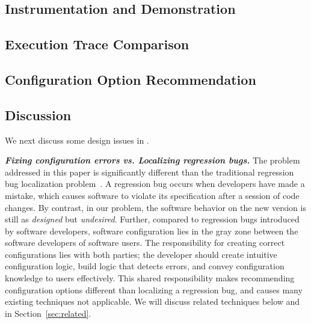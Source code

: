 \subsection{Instrumentation and Demonstration}
\label{sec:profiling}



\subsection{Execution Trace Comparison}
\label{sec:comparison}



\subsection{Configuration Option Recommendation}
\label{sec:rootcause}



\subsection{Discussion}
\label{sec:tech_discuss}

We next discuss some design issues in \ourtool.

\vspace{1mm}

\noindent \textbf{\textit{Fixing configuration errors 
vs. Localizing regression bugs.}}
The problem addressed in this paper is significantly different
than the traditional regression bug localization problem~\cite{dd, autoflow}.
A regression bug occurs when developers have made a mistake,
which causes software to violate its specification after a session of code changes.
By contrast, in our problem, the software behavior on the new version
is still as \textit{designed} but \textit{undesired}. 
Further, compared to
regression bugs introduced by software developers,
software configuration lies in the gray zone between
the software developers of software users. The responsibility for creating
correct configurations lies with both parties; the developer should create
intuitive configuration logic, build logic that detects
errors, and convey configuration knowledge to users
effectively. This shared responsibility makes recommending configuration options
different than localizing a regression bug, and causes many existing
techniques not applicable. We will discuss related techniques below
and in Section~\ref{sec:related}.


